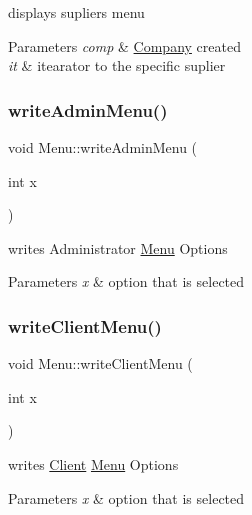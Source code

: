 displays supliers menu 


\begin{DoxyParams}{Parameters}
{\em comp} & \hyperlink{class_company}{Company} created\\
\hline
{\em it} & itearator to the specific suplier \\
\hline
\end{DoxyParams}
\hypertarget{class_menu_a604dde8d1682c7a528e53e8a4304297c}{}\label{class_menu_a604dde8d1682c7a528e53e8a4304297c} 
\subsubsection{\texorpdfstring{write\+Admin\+Menu()}{writeAdminMenu()}}
{\footnotesize\ttfamily void Menu\+::write\+Admin\+Menu (\begin{DoxyParamCaption}\item[{int}]{x }\end{DoxyParamCaption})}



writes Administrator \hyperlink{class_menu}{Menu} Options 


\begin{DoxyParams}{Parameters}
{\em x} & option that is selected \\
\hline
\end{DoxyParams}
\hypertarget{class_menu_ad2ab81c4a817ce989669873977dc59c2}{}\label{class_menu_ad2ab81c4a817ce989669873977dc59c2} 
\subsubsection{\texorpdfstring{write\+Client\+Menu()}{writeClientMenu()}}
{\footnotesize\ttfamily void Menu\+::write\+Client\+Menu (\begin{DoxyParamCaption}\item[{int}]{x }\end{DoxyParamCaption})}



writes \hyperlink{class_client}{Client} \hyperlink{class_menu}{Menu} Options 


\begin{DoxyParams}{Parameters}
{\em x} & option that is selected \\
\hline
\end{DoxyParams}
\hypertarget{class_menu_a807767f25b48bb6007fd437ce20ca9ee}{}\label{class_menu_a807767f25b48bb6007fd437ce20ca9ee} 
